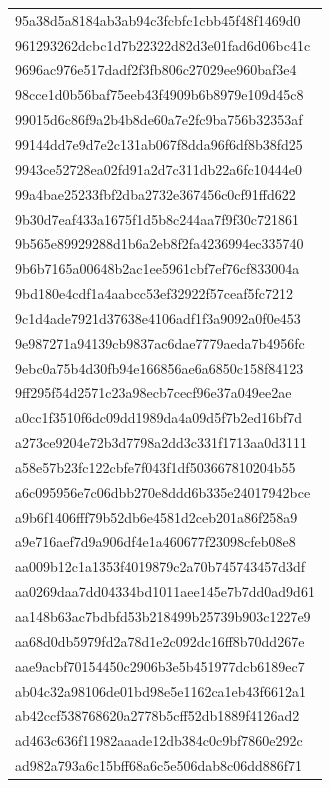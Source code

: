 \begin{tabular}{l}
95a38d5a8184ab3ab94c3fcbfc1cbb45f48f1469d0 \\
961293262dcbc1d7b22322d82d3e01fad6d06bc41c \\
9696ac976e517dadf2f3fb806c27029ee960baf3e4 \\
98cce1d0b56baf75eeb43f4909b6b8979e109d45c8 \\
99015d6c86f9a2b4b8de60a7e2fc9ba756b32353af \\
99144dd7e9d7e2c131ab067f8dda96f6df8b38fd25 \\
9943ce52728ea02fd91a2d7c311db22a6fc10444e0 \\
99a4bae25233fbf2dba2732e367456c0cf91ffd622 \\
9b30d7eaf433a1675f1d5b8c244aa7f9f30c721861 \\
9b565e89929288d1b6a2eb8f2fa4236994ec335740 \\
9b6b7165a00648b2ac1ee5961cbf7ef76cf833004a \\
9bd180e4cdf1a4aabcc53ef32922f57ceaf5fc7212 \\
9c1d4ade7921d37638e4106adf1f3a9092a0f0e453 \\
9e987271a94139cb9837ac6dae7779aeda7b4956fc \\
9ebc0a75b4d30fb94e166856ae6a6850c158f84123 \\
9ff295f54d2571c23a98ecb7cecf96e37a049ee2ae \\
a0cc1f3510f6dc09dd1989da4a09d5f7b2ed16bf7d \\
a273ce9204e72b3d7798a2dd3c331f1713aa0d3111 \\
a58e57b23fc122cbfe7f043f1df503667810204b55 \\
a6c095956e7c06dbb270e8ddd6b335e24017942bce \\
a9b6f1406fff79b52db6e4581d2ceb201a86f258a9 \\
a9e716aef7d9a906df4e1a460677f23098cfeb08e8 \\
aa009b12c1a1353f4019879c2a70b745743457d3df \\
aa0269daa7dd04334bd1011aee145e7b7dd0ad9d61 \\
aa148b63ac7bdbfd53b218499b25739b903c1227e9 \\
aa68d0db5979fd2a78d1e2c092dc16ff8b70dd267e \\
aae9acbf70154450c2906b3e5b451977dcb6189ec7 \\
ab04c32a98106de01bd98e5e1162ca1eb43f6612a1 \\
ab42ccf538768620a2778b5cff52db1889f4126ad2 \\
ad463c636f11982aaade12db384c0c9bf7860e292c \\
ad982a793a6c15bff68a6c5e506dab8c06dd886f71 \\

\end{tabular}
